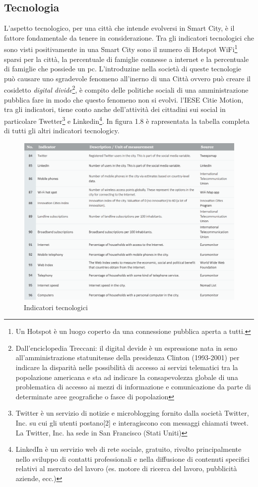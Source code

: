 \subsection{Tecnologia}
L'aspetto tecnologico, per una città che intende evolversi in Smart City, è il fattore fondamentale da tenere in considerazione. Tra gli indicatori tecnologici che sono visti positivamente in una Smart City sono il numero di Hotspot WiFi\footnote{Un Hotspot è un luogo coperto da una connessione pubblica aperta a tutti.} sparsi per la città, la percentuale di famiglie connesse a internet e la percentuale di famiglie che possiede un pc. L'introduzine nella società di queste tecnologie può causare uno sgradevole fenomeno all'inerno di una Città ovvero può  creare il cosidetto \textit{digital divide}\footnote{Dall'enciclopedia Treccani: il digital devide è un espressione nata in seno all’amministrazione statunitense della presidenza Clinton (1993-2001) per indicare la disparità nelle possibilità di accesso ai servizi telematici tra la popolazione americana e sta ad indicare la consapevolezza globale di una problematica di accesso ai mezzi di informazione e comunicazione da parte di determinate aree geografiche o fasce di popolazion},\cite{problem_smar_city_digitaldivide} è compito delle politiche sociali di una amministrazione pubblica fare in modo che questo fenomeno non si evolvi. \cite{iese_cities_2019}
l'IESE Citie Motion, tra gli indicatori, tiene conto anche dell'attività dei cittadini sui social in particolare Twetter\footnote{Twitter è un servizio di notizie e microblogging fornito dalla società Twitter, Inc. su cui gli utenti postano[2] e interagiscono con messaggi chiamati tweet. La Twitter, Inc. ha sede in San Francisco (Stati Uniti)} e Linkedin\footnote{LinkedIn è un servizio web di rete sociale, gratuito, rivolto principalmente nello sviluppo di contatti professionali e nella diffusione di contenuti specifici relativi al mercato del lavoro (es. motore di ricerca del lavoro, pubblicità aziende, ecc.)}.
In figura 1.8 è rapresentata la tabella completa di tutti gli altri indicatori tecnologicy.
\begin{figure}[ht]
	\begin{center}
		\includegraphics[width=320bp]{img/indicatori_tecnologici.png}
		\caption{Indicatori tecnologici}
	\end{center}
\end{figure}

